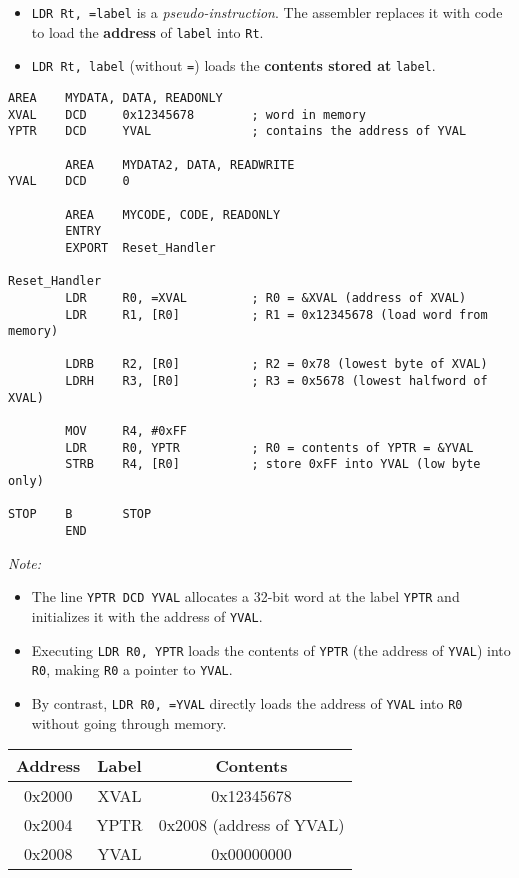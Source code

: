\begin{itemize}[nosep]
  \item \texttt{LDR Rt, =label} is a \emph{pseudo-instruction}. The assembler replaces it with code to load the \textbf{address} of \texttt{label} into \texttt{Rt}.
  \item \texttt{LDR Rt, label} (without \texttt{=}) loads the \textbf{contents stored at} \texttt{label}.
\end{itemize}
\newpage
\begin{lstlisting}[caption={Examples of Load and Store Instructions}]
        AREA    MYDATA, DATA, READONLY
XVAL    DCD     0x12345678        ; word in memory
YPTR    DCD     YVAL              ; contains the address of YVAL

        AREA    MYDATA2, DATA, READWRITE
YVAL    DCD     0

        AREA    MYCODE, CODE, READONLY
        ENTRY
        EXPORT  Reset_Handler

Reset_Handler
        LDR     R0, =XVAL         ; R0 = &XVAL (address of XVAL)
        LDR     R1, [R0]          ; R1 = 0x12345678 (load word from memory)

        LDRB    R2, [R0]          ; R2 = 0x78 (lowest byte of XVAL)
        LDRH    R3, [R0]          ; R3 = 0x5678 (lowest halfword of XVAL)

        MOV     R4, #0xFF
        LDR     R0, YPTR          ; R0 = contents of YPTR = &YVAL
        STRB    R4, [R0]          ; store 0xFF into YVAL (low byte only)

STOP    B       STOP
        END
\end{lstlisting}
\noindent\textit{Note:}  
\begin{itemize}[nosep]
    \item The line \texttt{YPTR DCD YVAL} allocates a 32-bit word at the label \texttt{YPTR} and initializes it with the address of \texttt{YVAL}.  
    \item Executing \texttt{LDR R0, YPTR} loads the contents of \texttt{YPTR} (the address of \texttt{YVAL}) into \texttt{R0}, making \texttt{R0} a pointer to \texttt{YVAL}.  
    \item By contrast, \texttt{LDR R0, =YVAL} directly loads the address of \texttt{YVAL} into \texttt{R0} without going through memory.  
\end{itemize}

\begin{center}
\begin{tabular}{|c|c|c|}
\hline
Address & Label & Contents \\
\hline
0x2000 & XVAL & 0x12345678 \\
0x2004 & YPTR & 0x2008 (address of YVAL) \\
0x2008 & YVAL & 0x00000000 \\
\hline
\end{tabular}
\end{center}

